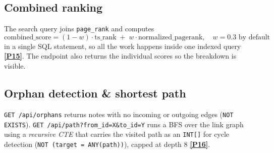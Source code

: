 \documentclass[11pt,a4paper]{article}
\newcommand{\prm}[1]{\href{PROMPT_LOG.md}{\textbf{[P#1]}}}
\begin{document}
\subsection{Combined ranking}
The search query joins \texttt{page\_rank} and computes
\[
\text{combined\_score} = (1-w)\cdot\text{ts\_rank} \;+\; w\cdot\text{normalized\_pagerank}, \quad w=0.3 \text{ by default}
\]
in a single SQL statement, so all the work happens inside one indexed query \prm{15}. The endpoint also returns the individual scores so the breakdown is visible.

\subsection{Orphan detection \& shortest path}
\texttt{GET /api/orphans} returns notes with no incoming or outgoing edges (\texttt{NOT EXISTS}). \texttt{GET /api/path?from\_id=X\&to\_id=Y} runs a BFS over the link graph using a \emph{recursive CTE} that carries the visited path as an \texttt{INT[]} for cycle detection (\verb|NOT (target = ANY(path))|), capped at depth 8 \prm{16}.
\end{document}
